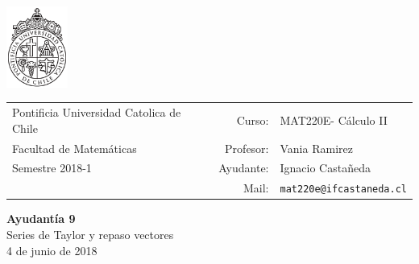 \documentclass[12pt]{article}
\makeatletter
\newcommand{\ayudantia}{{\sc Ayudantía 9}}
\newcommand{\tituloayu}{Series de Taylor y repaso vectores}
\newcommand{\fecha}{4 de junio de 2018}
\newcommand{\sigla}{MAT220E}
\newcommand{\nombre}{Cálculo II}
\newcommand{\profesor}{Vania Ramirez}
\newcommand{\ano}{2018}
\newcommand{\semestre}{1}
\newcommand{\mail}{mat220e@ifcastaneda.cl}
\makeatother
\begin{document}
\thispagestyle{empty}

\begin{minipage}{2cm}
	\includegraphics[width=2cm]{../../../../img/logo.pdf}
	\vspace{0.5cm}
\end{minipage}
\begin{minipage}{\linewidth}
	\begin{tabular}{lrl}
		{\scriptsize\sc Pontificia Universidad Catolica de Chile} & \hspace*{0.7in}Curso: &
		\sigla  - \nombre\\
		{\sc Facultad de Matemáticas}&
		Profesor: & \profesor \\
		{\sc Semestre \ano-\semestre} & Ayudante: & {Ignacio Castañeda}\\
		& {Mail:} & \texttt{\mail}
	\end{tabular}
\end{minipage}

\vspace{-10mm}
\begin{center}
	{\LARGE\bf \ayudantia}\\
	\vspace{0.1cm}
	{\tituloayu}\\
	\vspace{0.1cm}
	\fecha\\
	\vspace{0.4cm}
\end{center}
\end{document}
